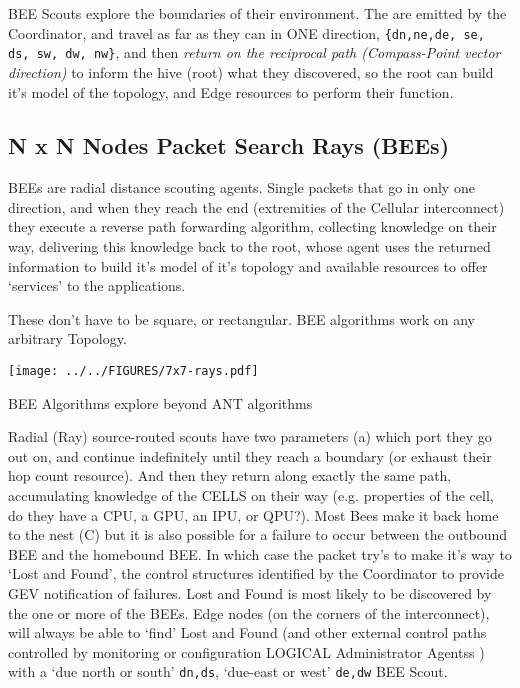 \documentclass[../HFT-main.tex]{subfiles}
\begin{document}
BEE Scouts explore the boundaries of their environment.  The are emitted by the Coordinator, and travel as far as they can in ONE direction, \texttt{\{dn,ne,de, se, ds, sw, dw, nw\}}, and then \emph{return on the reciprocal path (Compass-Point vector direction)} to inform the hive (root) what they discovered, so the root can build it's model of the topology, and Edge resources to perform their function. 

\subsection{N x N Nodes Packet Search Rays (BEEs)}

BEEs  are radial distance scouting agents. Single packets that go in only one direction, and when they reach the end (extremities of the Cellular interconnect) they execute a reverse path forwarding algorithm, collecting knowledge on their way, delivering this knowledge back to the root, whose agent  uses the returned information to build it's model of it's topology and available resources to offer `services' to the applications.

These don't have to be square, or rectangular. BEE algorithms work on any arbitrary Topology.

 \begin{marginfigure}
        \texttt{[image: ../../FIGURES/7x7-rays.pdf]} %
  \caption{BEE Algorithms explore beyond ANT algorithms}
    \vspace{20pt}
\end{marginfigure}

Radial (Ray) source-routed scouts have two parameters (a) which port they go out on, and continue indefinitely until they reach a boundary (or exhaust their hop count resource). And then they return along exactly the same path, accumulating knowledge of the CELLS on their way (e.g. properties of the cell, do they have a CPU, a GPU, an IPU, or QPU?).  Most Bees make it back home to the nest (C) but it is also possible for a failure to occur between the outbound BEE and the homebound BEE. In which case the packet try's to make it's way to `Lost and Found', the control structures identified by the Coordinator to provide GEV notification of failures.  Lost and Found is most likely to be discovered by the one or more of the BEEs. Edge nodes (on the corners of the interconnect), will always be able to `find' Lost and Found (and other external control paths controlled by monitoring or configuration LOGICAL Administrator Agentss ) with a `due north or south'  \texttt{dn,ds}, `due-east or west' \texttt{de,dw} BEE Scout. 
\end{document}
